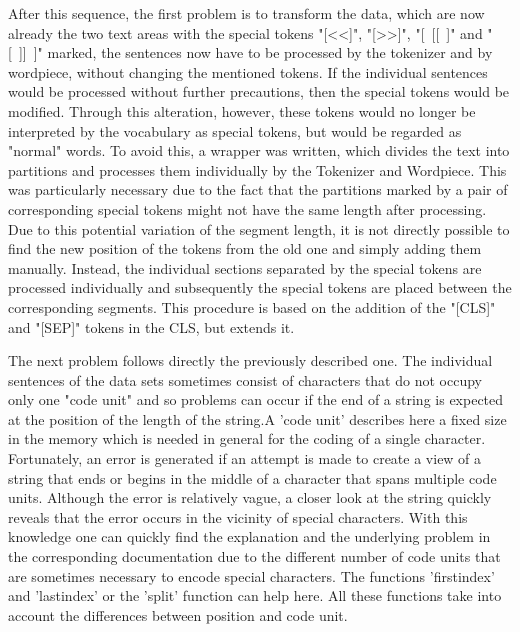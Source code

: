 After this sequence, the first problem is to transform the data, which are now already the two text areas with the special tokens "[\textless\textless]", "[\textgreater\textgreater]", "[~[[~]" and "[~]]~]" marked, the sentences now have to be processed by the tokenizer and by wordpiece, without changing the mentioned tokens. If the individual sentences would be processed without further precautions, then the special tokens would be modified. Through this alteration, however, these tokens would no longer be interpreted by the vocabulary as special tokens, but would be regarded as "normal" words. To avoid this, a wrapper was written, which divides the text into partitions and processes them individually by the Tokenizer and Wordpiece. This was particularly necessary due to the fact that the partitions marked by a pair of corresponding special tokens might not have the same length after processing. Due to this potential variation of the segment length, it is not directly possible to find the new position of the tokens from the old one and simply adding them manually. Instead, the individual sections separated by the special tokens are processed individually and subsequently the special tokens are placed between the corresponding segments. This procedure is based on the addition of the "[CLS]" and "[SEP]" tokens in the CLS, but extends it.

\color{red}
The next problem follows directly the previously described one. The individual sentences of the data sets sometimes consist of characters that do not occupy only one "code unit" and so problems can occur if the end of a string is expected at the position of the length of the string.A 'code unit' describes here a fixed size in the memory which is needed in general for the coding of a single character. Fortunately, an error is generated if an attempt is made to create a view of a string that ends or begins in the middle of a character that spans multiple code units. Although the error is relatively vague, a closer look at the string quickly reveals that the error occurs in the vicinity of special characters. With this knowledge one can quickly find the explanation and the underlying problem in the corresponding documentation due to the different number of code units that are sometimes necessary to encode special characters. The functions 'firstindex' and 'lastindex' or the 'split' function can help here. All these functions take into account the differences between position and code unit.
\color{black}